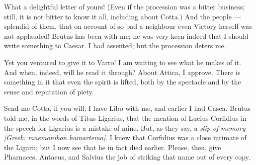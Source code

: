 

 What a delightful letter of yours! (Even if the procession was a bitter business; still, it is not bitter to know it all, including about Cotta.) And the people --- splendid of them, that on account of so bad a neighbour even Victory herself was not applauded! Brutus has been with me; he was very keen indeed that I should write something to Caesar. I had assented; but the procession deters me.

 Yet you ventured to give it to Varro! I am waiting to see what he makes of it. And when, indeed, will he read it through? About Attica, I approve. There is something in it that even the spirit is lifted, both by the spectacle and by the sense and reputation of piety.

 Send me Cotta, if you will; I have Libo with me, and earlier I had Casca. Brutus told me, in the words of Titus Ligarius, that the mention of Lucius Corfidius in the speech for Ligarius is a mistake of mine. But, as they say, a \textit{slip of memory} \textit{[Greek: mnemonikon hamartema]}. I knew that Corfidius was a close intimate of the Ligarii; but I now see that he in fact died earlier. Please, then, give Pharnaces, Antaeus, and Salvius the job of striking that name out of every copy.
